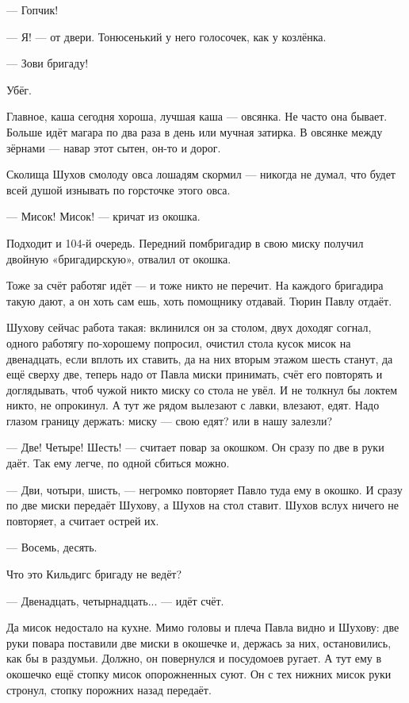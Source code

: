 --- Гопчик!

--- Я! --- от двери. Тонюсенький у него голосочек, как у козлёнка.

--- Зови бригаду!

Убёг.

Главное, каша сегодня хороша, лучшая каша --- овсянка. Не часто она бывает. Больше идёт магара
по два раза в день или мучная затирка. В овсянке между зёрнами --- навар этот сытен, он-то и
дорог.

Сколища Шухов смолоду овса лошадям скормил --- никогда не думал, что будет всей душой
изнывать по горсточке этого овса.

--- Мисок! Мисок! --- кричат из окошка.

Подходит и 104-й очередь. Передний помбригадир в свою миску получил двойную «бригадирскую»,
отвалил от окошка.

Тоже за счёт работяг идёт --- и тоже никто не перечит. На каждого бригадира такую дают, а он
хоть сам ешь, хоть помощнику отдавай. Тюрин Павлу отдаёт.

Шухову сейчас работа такая: вклинился он за столом, двух доходяг согнал, одного работягу
по-хорошему попросил, очистил стола кусок мисок на двенадцать, если вплоть их ставить, да на
них вторым этажом шесть станут, да ещё сверху две, теперь надо от Павла миски принимать, счёт
его повторять и доглядывать, чтоб чужой никто миску со стола не увёл. И не толкнул бы локтем
никто, не опрокинул. А тут же рядом вылезают с лавки, влезают, едят. Надо глазом границу
держать: миску --- свою едят? или в нашу залезли?

--- Две! Четыре! Шесть! --- считает повар за окошком. Он сразу по две в руки даёт. Так ему легче, по
одной сбиться можно.

--- Дви, чотыри, шисть, --- негромко повторяет Павло туда ему в окошко. И сразу по две миски
передаёт Шухову, а Шухов на стол ставит. Шухов вслух ничего не повторяет, а считает острей их.

--- Восемь, десять.

Что это Кильдигс бригаду не ведёт?

--- Двенадцать, четырнадцать... --- идёт счёт.

Да мисок недостало на кухне. Мимо головы и плеча Павла видно и Шухову: две руки повара
поставили две миски в окошечке и, держась за них, остановились, как бы в раздумьи. Должно, он
повернулся и посудомоев ругает. А тут ему в окошечко ещё стопку мисок опорожненных суют. Он с
тех нижних мисок руки стронул, стопку порожних назад передаёт.

